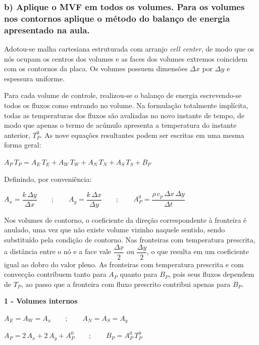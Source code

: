 \subsubsection*{b) Aplique o MVF em todos os volumes. Para os volumes nos contornos aplique o método do balanço de energia apresentado na aula.}

Adotou-se malha cartesiana estruturada com arranjo \textit{cell center}, de modo que os nós ocupam os centros dos volumes e as faces dos volumes extremos coincidem com os contornos da placa. Os volumes possuem dimensões $\Delta x$ por $\Delta y$ e espessura uniforme.

Para cada volume de controle, realizou-se o balanço de energia escrevendo-se todos os fluxos como entrando no volume. Na formulação totalmente implícita, todas as temperaturas dos fluxos são avaliadas no novo instante de tempo, de modo que apenas o termo de acúmulo apresenta a temperatura do instante anterior, $T_{P}^{0}$. As nove equações resultantes podem ser escritas em uma mesma forma geral:

\begin{center}
    $A_{P}\,T_{P} = A_{E}\,T_{E} + A_{W}\,T_{W} + A_{N}\,T_{N} + A_{S}\,T_{S} + B_{P}$
\end{center}

Definindo, por conveniência:

\begin{center}
    $A_{x} = \dfrac{k\,\Delta y}{\Delta x} \qquad ; \qquad A_{y} = \dfrac{k\,\Delta x}{\Delta y} \qquad ; \qquad A_{P}^{0} = \dfrac{\rho\,c_{p}\,\Delta x\,\Delta y}{\Delta t}$
\end{center}

Nos volumes de contorno, o coeficiente da direção correspondente à fronteira é anulado, uma vez que não existe volume vizinho naquele sentido, sendo substituído pela condição de contorno. Nas fronteiras com temperatura prescrita, a distância entre o nó e a face vale $\dfrac{\Delta x}{2}$ ou $\dfrac{\Delta y}{2}$, o que resulta em um coeficiente igual ao dobro do valor pleno. As fronteiras com temperatura prescrita e com convecção contribuem tanto para $A_{P}$ quanto para $B_{P}$, pois seus fluxos dependem de $T_{P}$, ao passo que a fronteira com fluxo prescrito contribui apenas para $B_{P}$.

\vspace{0.5cm}
\noindent\textbf{1 - Volumes internos}

\begin{center}
    $A_{E} = A_{W} = A_{x} \qquad ; \qquad A_{N} = A_{S} = A_{y}$
\end{center}
\begin{center}
    $A_{P} = 2\,A_{x} + 2\,A_{y} + A_{P}^{0} \qquad ; \qquad B_{P} = A_{P}^{0}\,T_{P}^{0}$
\end{center}

